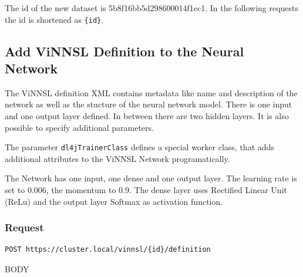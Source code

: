 The id of the new dataset is 5b8f16bb5d298600014f1ec1. In the following
requests the id is shortened as \texttt{\{id\}}.

\subsection{Add ViNNSL Definition to the Neural
Network}\label{add-vinnsl-definition-to-the-neural-network-2}

The ViNNSL definition XML contains metadata like name and description of
the network as well as the stucture of the neural network model. There
is one input and one output layer defined. In between there are two
hidden layers. It is also possible to specify additional parameters.

The parameter \texttt{dl4jTrainerClass} defines a special worker class,
that adds additional attributes to the ViNNSL Network programatically.

The Network has one input, one dense and one output layer. The learning
rate is set to 0.006, the momentum to 0.9. The dense layer uses
Rectified Linear Unit (ReLu) and the output layer Softmax as activation
function.

\subsubsection{Request}\label{request-7}

\begin{verbatim}
POST https://cluster.local/vinnsl/{id}/definition
\end{verbatim}

BODY

